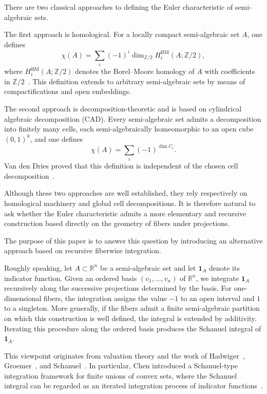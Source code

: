 \documentclass[11pt]{article}
\theoremstyle{remark}
\newcommand{\R}{\mathbb R}
\newcommand{\1}{\mathbf 1}
\begin{document}
There are two classical approaches to defining the Euler characteristic of semi-algebraic sets.

The first approach is homological. For a locally compact semi-algebraic set $A$, one defines
\[
\chi(A)=\sum_i(-1)^i\dim_{\mathbb Z/2}H_i^{\mathrm{BM}}(A;\mathbb Z/2),
\]
where $H_i^{\mathrm{BM}}(A;\mathbb Z/2)$ denotes the Borel--Moore homology of $A$ with coefficients in $\mathbb Z/2$~\cite{coste2005real}. This definition extends to arbitrary semi-algebraic sets by means of compactifications and open embeddings.

The second approach is decomposition-theoretic and is based on cylindrical algebraic decomposition (CAD). Every semi-algebraic set admits a decomposition into finitely many cells, each semi-algebraically homeomorphic to an open cube $(0,1)^k$, and one defines
\[
\chi(A)=\sum_i(-1)^{\dim C_i}.
\]
Van den Dries proved that this definition is independent of the chosen cell decomposition~\cite{van1998tame}.

Although these two approaches are well established, they rely respectively on homological machinery and global cell decompositions. It is therefore natural to ask whether the Euler characteristic admits a more elementary and recursive construction based directly on the geometry of fibers under projections.

The purpose of this paper is to answer this question by introducing an alternative approach based on recursive fiberwise integration.

Roughly speaking, let $A\subset\R^n$ be a semi-algebraic set and let $\mathbf 1_A$ denote its indicator function. Given an ordered basis $(v_1,\dots,v_n)$ of $\R^n$, we integrate $\mathbf 1_A$ recursively along the successive projections determined by the basis. For one-dimensional fibers, the integration assigns the value $-1$ to an open interval and $1$ to a singleton. More generally, if the fibers admit a finite semi-algebraic partition on which this construction is well defined, the integral is extended by additivity. Iterating this procedure along the ordered basis produces the Schanuel integral of $\mathbf 1_A$.

This viewpoint originates from valuation theory and the work of
Hadwiger~\cite{hadwiger1955eulers},
Groemer~\cite{groemer1972eulersche},
and Schanuel~\cite{schanuel2006length,schanuel2006negative}.
In particular, Chen introduced a Schanuel-type integration framework for finite unions of convex sets, where the Schanuel integral can be regarded as an iterated integration process of indicator functions~\cite{chen1993euler}.
\end{document}

